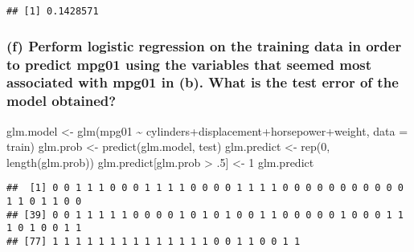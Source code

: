 \documentclass[
]{article}
\newenvironment{Shaded}{\begin{snugshade}}{\end{snugshade}}
\newcommand{\AttributeTok}[1]{\textcolor[rgb]{0.77,0.63,0.00}{#1}}
\newcommand{\DecValTok}[1]{\textcolor[rgb]{0.00,0.00,0.81}{#1}}
\newcommand{\FunctionTok}[1]{\textcolor[rgb]{0.00,0.00,0.00}{#1}}
\newcommand{\NormalTok}[1]{#1}
\newcommand{\OtherTok}[1]{\textcolor[rgb]{0.56,0.35,0.01}{#1}}
\newcommand{\SpecialCharTok}[1]{\textcolor[rgb]{0.00,0.00,0.00}{#1}}
\begin{document}
\begin{verbatim}
## [1] 0.1428571
\end{verbatim}

\hypertarget{f-perform-logistic-regression-on-the-training-data-in-order-to-predict-mpg01-using-the-variables-that-seemed-most-associated-with-mpg01-in-b.-what-is-the-test-error-of-the-model-obtained}{%
\subsubsection{(f) Perform logistic regression on the training data in
order to predict mpg01 using the variables that seemed most associated
with mpg01 in (b). What is the test error of the model
obtained?}\label{f-perform-logistic-regression-on-the-training-data-in-order-to-predict-mpg01-using-the-variables-that-seemed-most-associated-with-mpg01-in-b.-what-is-the-test-error-of-the-model-obtained}}

\begin{Shaded}
\begin{Highlighting}[]
\NormalTok{glm.model }\OtherTok{\textless{}{-}} \FunctionTok{glm}\NormalTok{(mpg01 }\SpecialCharTok{\textasciitilde{}}\NormalTok{ cylinders}\SpecialCharTok{+}\NormalTok{displacement}\SpecialCharTok{+}\NormalTok{horsepower}\SpecialCharTok{+}\NormalTok{weight, }\AttributeTok{data =}\NormalTok{ train)}
\NormalTok{glm.prob }\OtherTok{\textless{}{-}}  \FunctionTok{predict}\NormalTok{(glm.model, test)}
\NormalTok{glm.predict }\OtherTok{\textless{}{-}} \FunctionTok{rep}\NormalTok{(}\DecValTok{0}\NormalTok{, }\FunctionTok{length}\NormalTok{(glm.prob))}
\NormalTok{glm.predict[glm.prob }\SpecialCharTok{\textgreater{}}\NormalTok{ .}\DecValTok{5}\NormalTok{] }\OtherTok{\textless{}{-}} \DecValTok{1}
\NormalTok{glm.predict}
\end{Highlighting}
\end{Shaded}

\begin{verbatim}
##  [1] 0 0 1 1 1 0 0 0 1 1 1 1 0 0 0 0 1 1 1 1 0 0 0 0 0 0 0 0 0 0 0 1 1 0 1 1 0 0
## [39] 0 0 1 1 1 1 1 0 0 0 0 1 0 1 0 1 0 0 1 1 0 0 0 0 0 1 0 0 0 1 1 1 0 1 0 0 1 1
## [77] 1 1 1 1 1 1 1 1 1 1 1 1 1 1 0 0 1 1 0 0 1 1
\end{verbatim}

\begin{Shaded}
\end{Shaded}
\end{document}
